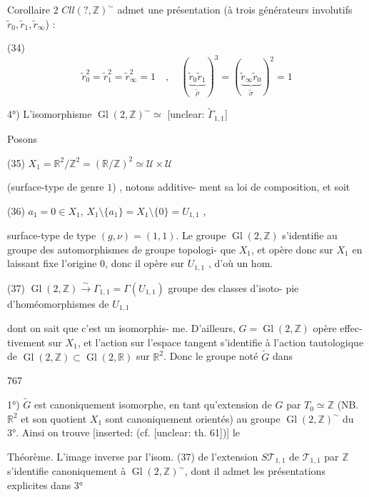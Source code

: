 Corollaire 2 $Cll(?, \mathbb{Z})^\sim$ admet une présentation
(à trois générateurs involutifs $\tilde{r}_0, \tilde{r}_1, \tilde{r}_\infty$) :

(34) $$ \tilde{r}_0^2 = \tilde{r}_1^2 = \tilde{r}_\infty^2 = 1 \quad , \quad (\underbrace{\tilde{r}_0 \tilde{r}_1}_{\tilde{\rho}})^3 = (\underbrace{\tilde{r}_\infty \tilde{r}_0}_{\tilde{\sigma}})^2 = 1 $$

\newpage


4°) L'isomorphisme $\operatorname{Gl}(2, \mathbb{Z})^\sim \simeq$ [unclear: $\tilde{\Gamma}_{1,1}$]

Posons

(35) $X_1 = \mathbb{R}^2 / \mathbb{Z}^2 = (\mathbb{R}/\mathbb{Z})^2 \simeq \mathcal{U} \times \mathcal{U}$

(surface-type de genre $1$) , notons additive-
ment sa loi de composition, et soit

(36) $a_1 = 0 \in X_1$, $X_1 \setminus \{a_1\} = X_1 \setminus \{0\} = U_{1,1}$ ,

surface-type de type $(g,\nu) = (1,1)$.
Le groupe $\operatorname{Gl}(2, \mathbb{Z})$ s'identifie au groupe
des automorphismes de groupe topologi-
que $X_1$, et opère donc sur $X_1$ en laissant
fixe l'origine $0$, donc il opère
sur $U_{1,1}$ , d'où un hom.

(37) $\operatorname{Gl}(2, \mathbb{Z}) \xrightarrow{\sim} \Gamma_{1,1} = \Gamma(U_{1,1})$
groupe des classes d'isoto-
pie d'homéomorphismes
de $U_{1,1}$

dont on sait que c'est un isomorphis-
me. D'ailleurs, $G = \operatorname{Gl}(2, \mathbb{Z})$ opère effec-
tivement sur $X_1$, et l'action sur
l'espace tangent s'identifie à l'action
tautologique de $\operatorname{Gl}(2, \mathbb{Z}) \subset \operatorname{Gl}(2, \mathbb{R})$
sur $\mathbb{R}^2$. Donc le groupe noté $\tilde{G}$ dans

\newpage


767

1°) $\tilde{G}$ est canoniquement isomorphe, en
tant qu'extension de $G$ par $T_0 \simeq \mathbb{Z}$ (NB.
$\mathbb{R}^2$ et son quotient $X_1$ sont canoniquement
orientés) au groupe $\operatorname{Gl}(2, \mathbb{Z})^\sim$ du 3°.
Ainsi on trouve [inserted: (cf. [unclear: th. 61])] le

Théorème. L'image inverse par l'isom.
(37) de l'extension $S \mathcal{T}_{1,1}$ de $\mathcal{T}_{1,1}$ par $\mathbb{Z}$
s'identifie canoniquement à $\operatorname{Gl}(2, \mathbb{Z})^\sim$,
dont il admet les présentations explicites
dans 3°

